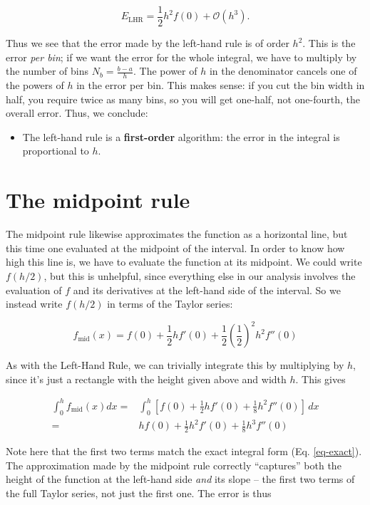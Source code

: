\documentclass[12ampt]{article}   %
\begin{document}
\begin{equation}
  E_{\mathrm{LHR}}=\frac{1}{2} h^2 f(0) + \mathcal O(h^3).
\end{equation}

Thus we see that the error made by the left-hand rule is of order $h^2$. This is the error {\it per bin}; if we want the error for the whole integral, we have to multiply
by the number of bins $N_b = \frac{b-a}{h}$. The power of $h$ in the denominator cancels one of the powers of $h$ in the error per bin. 
This makes sense: if you cut the bin width in half, you require twice as many bins, so you will get one-half, not one-fourth, the overall
error. Thus, we conclude:

\begin{itemize}
  \item{The left-hand rule is a {\bf first-order} algorithm: the error in the integral is proportional to $h$.}
\end{itemize}

\section{The midpoint rule}

The midpoint rule likewise approximates the function as a horizontal line, but this time one evaluated at the midpoint of the interval. In order to know how high this
line is, we have to evaluate the function at its midpoint. We could write $f(h/2)$, but this is unhelpful, since everything else in our analysis involves the evaluation of
$f$ and its derivatives at the left-hand side of the interval. So we instead write $f(h/2)$ in terms of the Taylor series:

\begin{equation}
  f_{\mathrm{mid}}(x) = f(0) + \frac{1}{2}hf'(0) + \frac{1}{2}(\frac{1}{2})^2 h^2f''(0)
\end{equation}

As with the Left-Hand Rule, we can trivially integrate this by multiplying by $h$, since it's just a rectangle with the height given above and width $h$. This gives


\begin{align}
  \int_0^h f_{\mathrm{mid}}(x) dx =& \int_0^h \left[f(0) + \frac{1}{2}hf'(0) + \frac{1}{8} h^2f''(0)\right] \, dx \\
   =& hf(0) + \frac{1}{2}h^2 f'(0) + \frac{1}{8} h^3 f''(0)
\end{align}

Note here that the first two terms match the exact integral form (Eq. \ref{eq-exact}). The approximation made by the midpoint rule correctly ``captures'' both the height of the function at
the left-hand side {\it and} its slope -- the first two terms of the full Taylor series, not just the first one. The error is thus
\end{document}
